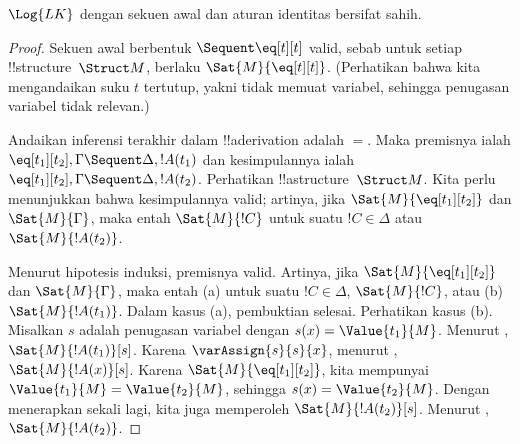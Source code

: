 \documentclass[../../../include/open-logic-section]{subfiles}
\begin{document}


\begin{prop}
$\Log{LK}$ dengan sekuen awal dan aturan identitas bersifat sahih.
\end{prop}

\begin{proof}
Sekuen awal berbentuk ${} \Sequent \eq[t][t]$ valid, sebab untuk setiap
!!{structure}~$\Struct M$, berlaku $\Sat{M}{\eq[t][t]}$. (Perhatikan
bahwa kita mengandaikan suku $t$ tertutup, yakni tidak memuat variabel,
sehingga penugasan variabel tidak relevan.)

Andaikan inferensi terakhir dalam !!a{derivation} adalah $=$. Maka
premisnya ialah $\eq[t_1][t_2], \Gamma \Sequent \Delta, !A(t_1)$ dan
kesimpulannya ialah $\eq[t_1][t_2], \Gamma \Sequent \Delta, !A(t_2)$.
Perhatikan !!a{structure}~$\Struct M$. Kita perlu menunjukkan bahwa
kesimpulannya valid; artinya, jika $\Sat{M}{\eq[t_1][t_2]}$ dan
$\Sat{M}{\Gamma}$, maka entah $\Sat{M}{!C}$ untuk suatu
$!C \in \Delta$ atau $\Sat{M}{!A(t_2)}$.

Menurut hipotesis induksi, premisnya valid. Artinya, jika
$\Sat{M}{\eq[t_1][t_2]}$ dan $\Sat{M}{\Gamma}$, maka entah (a) untuk
suatu $!C \in \Delta$, $\Sat{M}{!C}$, atau (b)
$\Sat{M}{!A(t_1)}$. Dalam kasus (a), pembuktian selesai. Perhatikan kasus
(b). Misalkan $s$ adalah penugasan variabel dengan
$s(x) = \Value{t_1}{M}$. Menurut
, $\Sat{M}{!A(t_1)}[s]$. Karena
$\varAssign{s}{s}{x}$, menurut ,
$\Sat{M}{!A(x)}[s]$. Karena $\Sat{M}{\eq[t_1][t_2]}$, kita mempunyai
$\Value{t_1}{M} = \Value{t_2}{M}$, sehingga
$s(x) = \Value{t_2}{M}$. Dengan menerapkan
 sekali lagi, kita juga memperoleh
$\Sat{M}{!A(t_2)}[s]$. Menurut
, $\Sat{M}{!A(t_2)}$.
\end{proof}
\end{document}
